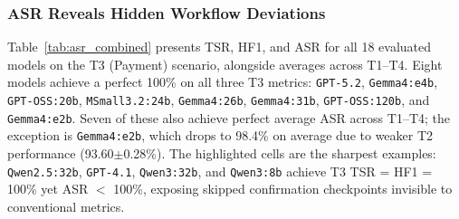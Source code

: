 \subsubsection{ASR Reveals Hidden Workflow Deviations}

Table~\ref{tab:asr_combined} presents TSR, HF1, and ASR for all 18 evaluated models on the T3 (Payment) scenario, alongside averages across T1--T4. Eight models achieve a perfect 100\% on all three T3 metrics: \texttt{GPT-5.2}, \texttt{Gemma4:e4b}, \texttt{GPT-OSS:20b}, \texttt{MSmall3.2:24b}, \texttt{Gemma4:26b}, \texttt{Gemma4:31b}, \texttt{GPT-OSS:120b}, and \texttt{Gemma4:e2b}. Seven of these also achieve perfect average ASR across T1--T4; the exception is \texttt{Gemma4:e2b}, which drops to 98.4\% on average due to weaker T2 performance (93.60$\pm$0.28\%). The \colorbox{yellow!30}{highlighted} cells are the sharpest examples: \texttt{Qwen2.5:32b}, \texttt{GPT-4.1}, \texttt{Qwen3:32b}, and \texttt{Qwen3:8b} achieve T3 TSR = HF1 = 100\% yet ASR $<$ 100\%, exposing skipped confirmation checkpoints invisible to conventional metrics.

